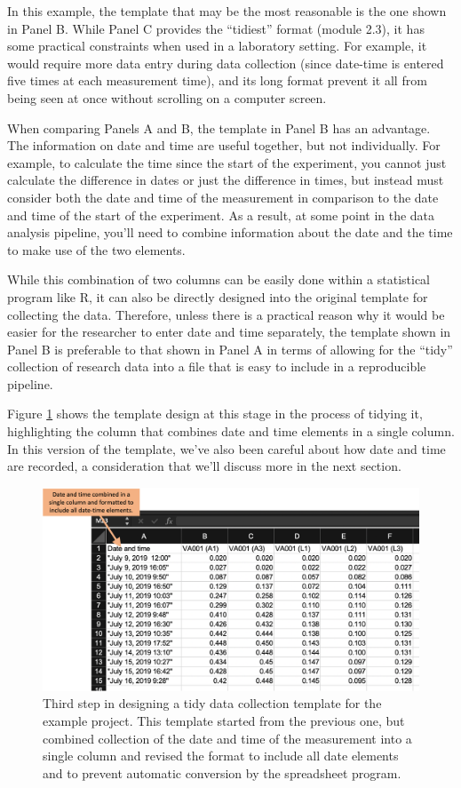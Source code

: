 \documentclass[]{tufte-book}
\begin{document}
In this example, the template that may be the most reasonable is the one shown
in Panel B. While Panel C provides the ``tidiest'' format (module 2.3), it has
some practical constraints when used in a laboratory setting. For example, it
would require more data entry during data collection (since date-time is entered
five times at each measurement time), and its long format prevent it all from
being seen at once without scrolling on a computer screen.

When comparing Panels A and B, the template in Panel B has an advantage. The
information on date and time are useful together, but not individually. For
example, to calculate the time since the start of the experiment, you cannot
just calculate the difference in dates or just the difference in times, but
instead must consider both the date and time of the measurement in comparison to
the date and time of the start of the experiment. As a result, at some point in
the data analysis pipeline, you'll need to combine information about the date
and the time to make use of the two elements.

While this combination of two columns can be easily done within a statistical
program like R, it can also be directly designed into the original template for
collecting the data. Therefore, unless there is a practical reason why it would
be easier for the researcher to enter date and time separately, the template
shown in Panel B is preferable to that shown in Panel A in terms of allowing for
the ``tidy'' collection of research data into a file that is easy to include in a
reproducible pipeline.

Figure \ref{fig:step3} shows the template design at this stage in the process
of tidying it, highlighting the column that combines date and time elements in a
single column. In this version of the template, we've also been careful about
how date and time are recorded, a consideration that we'll discuss more in the
next section.

\begin{figure}
\includegraphics[width=\textwidth]{figures/growth_curve_step3} \caption[Third step in designing a tidy data collection template for the example project]{Third step in designing a tidy data collection template for the example project. This template started from the previous one, but combined collection of the date and time of the measurement into a single column and revised the format to include all date elements and to prevent automatic conversion by the spreadsheet program.}\label{fig:step3}
\end{figure}
\end{document}
